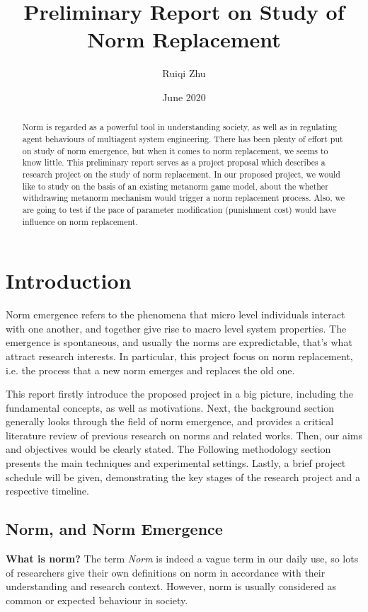 \documentclass[12pt]{extarticle}
\title{Preliminary Report on Study of Norm Replacement}
\author{Ruiqi Zhu}
\date{June 2020}
\begin{document}
\maketitle
\setlength{\parskip}{0.5em}

\begin{abstract}
Norm is regarded as a powerful tool in understanding society, as well as in regulating agent behaviours of multiagent system engineering. There has been plenty of effort put on study of norm emergence, but when it comes to norm replacement, we seems to know little. This preliminary report serves as a project proposal which describes a research project on the study of norm replacement. In our proposed project, we would like to study on the basis of an existing metanorm game model, about the whether withdrawing metanorm mechanism would trigger a norm replacement process. Also, we are going to test if the pace of parameter modification (punishment cost) would have influence on norm replacement.
\end{abstract}

\section{Introduction}
Norm emergence refers to the phenomena that micro level individuals interact with one another, and together give rise to macro level system properties. The emergence is spontaneous, and usually the norms are expredictable, that's what attract research interests. In particular, this project focus on norm replacement, i.e. the process that a new norm emerges and replaces the old one. 

This report firstly introduce the proposed project in a big picture, including the fundamental concepts, as well as motivations. Next, the background section generally looks through the field of norm emergence, and provides a critical literature review of previous research on norms and related works. Then, our aims and objectives would be clearly stated. The Following methodology section presents the main techniques and experimental settings.  Lastly, a brief project schedule will be given, demonstrating the key stages of the research project and a respective timeline. 

\subsection{Norm, and Norm Emergence}
\textbf{What is norm?} The term \textit{Norm} is indeed a vague term in our daily use, so lots of researchers give their own definitions on norm in accordance with their understanding and research context. However, norm is usually considered as common or expected behaviour in society. 
\end{document}

